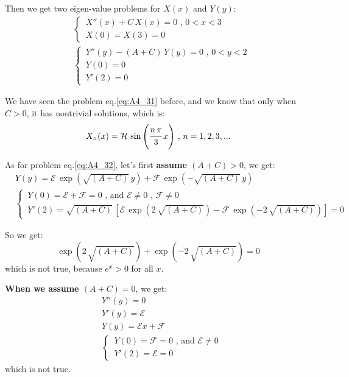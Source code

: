 \documentclass[../main.tex]{subfiles}
\begin{document}
Then we get two eigen-value problems for $X(x)$ and $Y(y)$:
\begin{align}
    & \begin{cases} \label{eq:A4_31}
        \, X''(x) + C \, X(x) = 0 \text{ ,  } 0 < x < 3 \\
        \, X(0) = X(3) = 0
    \end{cases} \\
    & \begin{cases} \label{eq:A4_32}
        \, Y''(y) - (A + C) \, Y(y) = 0 \text{ ,  } 0 < y < 2 \\
        \, Y(0) = 0 \\
        \, Y'(2) = 0
    \end{cases}
\end{align}

We have seen the problem eq.\ref{eq:A4_31} before, and we know that only when $C > 0$, it has nontrivial solutions, which is:
\begin{equation} 
    X_n(x) = \mathcal{H} \, \sin{\left(\cfrac{n \, \pi}{3} \, x \right)} \text{ ,  } n = 1, 2, 3, ...
\end{equation}

As for problem eq.\ref{eq:A4_32}, let's first \textbf{assume $(A + C) > 0$}, we get:
\begin{align}
    & Y(y) = \mathcal{E} \, \exp{(\sqrt{(A + C)} \, y)} + \mathcal{F} \, \exp{(- \sqrt{(A + C)} \, y)} \\
    & \begin{cases}
        \, Y(0) = \mathcal{E} + \mathcal{F} = 0 \text{ , and  } \mathcal{E} \neq 0 \text{ ,  } \mathcal{F} \neq 0 \\
        \, Y'(2) = \sqrt{(A + C)} \, \left[\mathcal{E} \, \exp{(2 \, \sqrt{(A + C)})} - \mathcal{F} \, \exp{(- 2 \, \sqrt{(A + C)})} \right] = 0 
    \end{cases}
\end{align}

So we get:
\begin{equation}
    \exp{(2 \, \sqrt{(A + C)})} + \exp{(- 2 \, \sqrt{(A + C)})} = 0
\end{equation}
which is not true, because $e^x > 0$ for all $x$.

\textbf{When we assume $(A + C) = 0$}, we get:
\begin{align}
    & Y''(y) = 0 \nonumber \\
    & Y'(y) = \mathcal{E} \nonumber \\
    & Y(y) = \mathcal{E} x + \mathcal{F} \\
    & \begin{cases}
        \, Y(0) = \mathcal{F} = 0 \text{ , and  } \mathcal{E} \neq 0 \\
        \, Y'(2) = \mathcal{E} = 0
    \end{cases}
\end{align}
which is not true.
\end{document}
